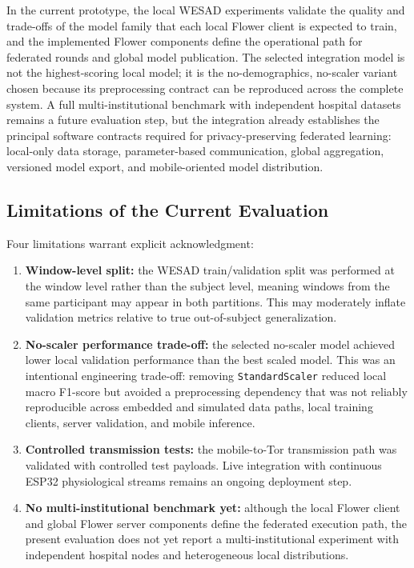 \documentclass[12pt]{article}
\begin{document}
In the current prototype, the local WESAD experiments validate the quality and trade-offs of the model family that each local Flower client is expected to train, and the implemented Flower components define the operational path for federated rounds and global model publication. The selected integration model is not the highest-scoring local model; it is the no-demographics, no-scaler variant chosen because its preprocessing contract can be reproduced across the complete system. A full multi-institutional benchmark with independent hospital datasets remains a future evaluation step, but the integration already establishes the principal software contracts required for privacy-preserving federated learning: local-only data storage, parameter-based communication, global aggregation, versioned model export, and mobile-oriented model distribution.

\FloatBarrier

\subsection{Limitations of the Current Evaluation}

Four limitations warrant explicit acknowledgment:

\begin{enumerate}[leftmargin=*]
\item
\textbf{Window-level split:} the WESAD train/validation split was performed at the window level rather than the subject level, meaning windows from the same participant may appear in both partitions. This may moderately inflate validation metrics relative to true out-of-subject generalization.

\item
\textbf{No-scaler performance trade-off:} the selected no-scaler model achieved lower local validation performance than the best scaled model. This was an intentional engineering trade-off: removing \texttt{StandardScaler} reduced local macro F1-score but avoided a preprocessing dependency that was not reliably reproducible across embedded and simulated data paths, local training clients, server validation, and mobile inference.

\item
\textbf{Controlled transmission tests:} the mobile-to-Tor transmission path was validated with controlled test payloads. Live integration with continuous ESP32 physiological streams remains an ongoing deployment step.

\item
\textbf{No multi-institutional benchmark yet:} although the local Flower client and global Flower server components define the federated execution path, the present evaluation does not yet report a multi-institutional experiment with independent hospital nodes and heterogeneous local distributions.

\end{enumerate}
\end{document}
